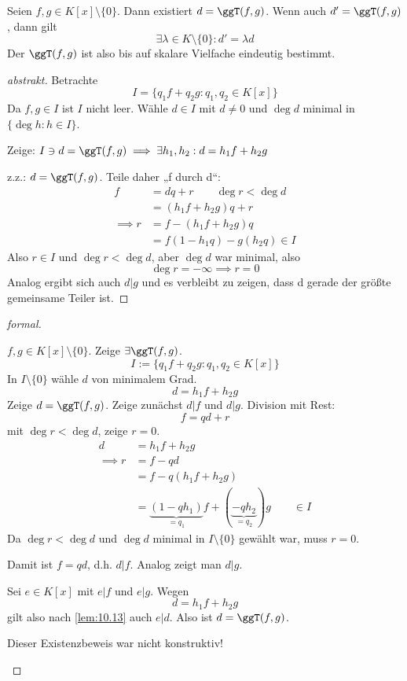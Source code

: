 \documentclass{mycourse}
\begin{document}
\begin{prop}
\label{prop:12.3}
Seien $f,g\in K[x]\setminus\{0\}$.
Dann existiert $d=\ggT(f,g)$.
Wenn auch $d'=\ggT(f,g)$, dann gilt
\[
\exists \lambda \in K\setminus\{0\}:d'=\lambda d
\]
Der $\ggT(f,g)$ ist also bis auf skalare Vielfache eindeutig bestimmt.

\begin{proof}[abstrakt]
Betrachte
\[
I=\{q_1f+q_2g:q_1,q_2\in K[x]\}
\]
Da $f,g\in I$ ist $I$ nicht leer.
Wähle $d\in I$ mit $d\neq 0$ und $\deg d$ minimal in $\{\deg h:h\in I\}$.

Zeige: $I\ni d=\ggT(f,g) \implies \exists h_1,h_2 : d=h_1f+h_2g$

z.z.: $d=\ggT(f,g)$.
Teile daher „f durch d“:
\begin{align*}
f&=dq + r \qquad \deg r < \deg d\\
&=(h_1f + h_2g)q + r\\
\implies r&= f-(h_1f+h_2g)q\\
&= f(1-h_1q) - g(h_2q) \in I
\end{align*}
Also $r\in I$ und $\deg r < \deg d$, aber $\deg d$ war minimal, also
\[
\deg r = -\infty \implies r=0
\]
Analog ergibt sich auch $d|g$ und es verbleibt zu zeigen, dass d gerade der größte gemeinsame Teiler ist.

\end{proof}

\begin{proof}[formal]
	\begin{seg}[Existenz]
$f,g\in K[x] \setminus \{0\}$. Zeige $\exists \ggT(f,g)$.
\[
I := \{q_1f+q_2g:q_1,q_2\in K[x]\}
\]
In $I\setminus \{0\}$ wähle $d$ von minimalem Grad.
\[
d=h_1f +h_2g
\]
Zeige $d=\ggT(f,g)$.
Zeige zunächst $d|f$ und $d|g$.
Division mit Rest:
\[
f=qd+r
\]
mit $\deg r < \deg d$, zeige $r=0$.
\begin{align*}
d&=h_1f+h_2g \\
\implies r&=f-qd \\
			 &= f-q(h_1f+h_2g)\\
	   &= \underbrace{(1-qh_1)}_{=q_1}f + (\underbrace{-qh_2}_{=q_2}) g \qquad \in I
\end{align*}
Da $\deg r < \deg d$ und $\deg d$ minimal in $I\setminus \{0\}$ gewählt war, muss $r=0$.

Damit ist $f=qd$, d.h. $d|f$.
Analog zeigt man $d|g$.

Sei $e\in K[x]$ mit $e|f$ und $e|g$.
Wegen
\[
d=h_1f+h_2g
\]
gilt also nach \ref{lem:10.13} auch $e|d$.
Also ist $d=\ggT(f,g)$.
\end{seg}
\begin{note}
Dieser Existenzbeweis war nicht konstruktiv!
\end{note}


\end{proof}
\end{prop}
\end{document}
